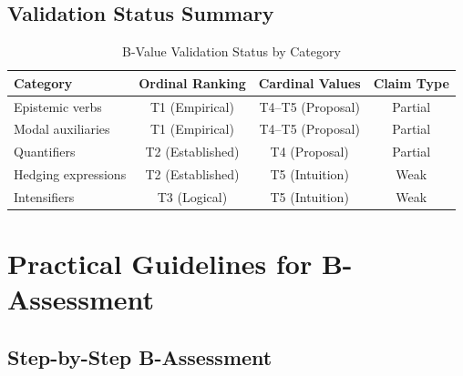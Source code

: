 \documentclass[11pt,a4paper]{article}
\theoremstyle{remark}
\begin{document}
\subsection{Validation Status Summary}

\begin{table}[h]
\centering
\caption{B-Value Validation Status by Category}
\label{tab:validation-status}
\begin{tabular}{lccc}
\toprule
\textbf{Category} & \textbf{Ordinal Ranking} & \textbf{Cardinal Values} & \textbf{Claim Type} \\
\midrule
Epistemic verbs & T1 (Empirical) & T4--T5 (Proposal) & Partial \\
Modal auxiliaries & T1 (Empirical) & T4--T5 (Proposal) & Partial \\
Quantifiers & T2 (Established) & T4 (Proposal) & Partial \\
Hedging expressions & T2 (Established) & T5 (Intuition) & Weak \\
Intensifiers & T3 (Logical) & T5 (Intuition) & Weak \\
\bottomrule
\end{tabular}
\end{table}


\section{Practical Guidelines for B-Assessment}
\label{sec:guidelines}

\subsection{Step-by-Step B-Assessment}
\end{document}
